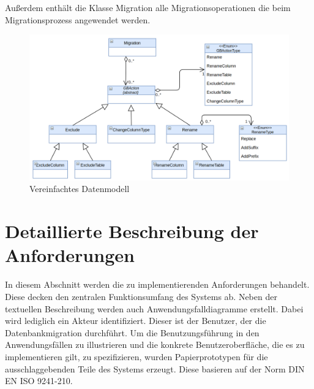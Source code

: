 Außerdem enthält die Klasse Migration alle Migrationsoperationen die beim Migrationsprozess angewendet werden.
\begin{figure}[H]
	\centering
	\includegraphics[width=\textwidth]{images/sichten/abstract-datenmodell}
	\caption{Vereinfachtes Datenmodell}
	\label{img:abstract-datenmodell}
\end{figure}


\section{Detaillierte Beschreibung der Anforderungen}
\label{sec:af}
In diesem Abschnitt werden die zu implementierenden Anforderungen behandelt. Diese decken den zentralen Funktionsumfang des Systems ab.
Neben der textuellen Beschreibung werden auch Anwendungsfalldiagramme erstellt. Dabei wird lediglich ein Akteur identifiziert. Dieser ist der Benutzer, der die Datenbankmigration durchführt. Um die Benutzungsführung in den Anwendungsfällen zu illustrieren und die konkrete Benutzeroberfläche, die es zu implementieren gilt, zu spezifizieren, wurden Papierprototypen für die ausschlaggebenden Teile des Systems erzeugt. Diese basieren auf der Norm DIN EN ISO 9241-210.




